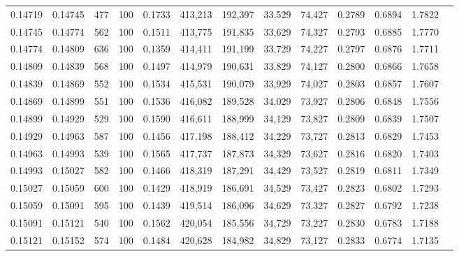 \begin{tabular}{rrrrrrrrrrrrr}
0.14719 & 0.14745 &   477 & 100 &                                     0.1733 & 413,213 & 192,397 &  33,529 &  74,427 & 0.2789 & 0.6894 & 1.7822 \\
0.14745 & 0.14774 &   562 & 100 &                                     0.1511 & 413,775 & 191,835 &  33,629 &  74,327 & 0.2793 & 0.6885 & 1.7770 \\
0.14774 & 0.14809 &   636 & 100 &                                     0.1359 & 414,411 & 191,199 &  33,729 &  74,227 & 0.2797 & 0.6876 & 1.7711 \\
0.14809 & 0.14839 &   568 & 100 &                                     0.1497 & 414,979 & 190,631 &  33,829 &  74,127 & 0.2800 & 0.6866 & 1.7658 \\
0.14839 & 0.14869 &   552 & 100 &                                     0.1534 & 415,531 & 190,079 &  33,929 &  74,027 & 0.2803 & 0.6857 & 1.7607 \\
0.14869 & 0.14899 &   551 & 100 &                                     0.1536 & 416,082 & 189,528 &  34,029 &  73,927 & 0.2806 & 0.6848 & 1.7556 \\
0.14899 & 0.14929 &   529 & 100 &                                     0.1590 & 416,611 & 188,999 &  34,129 &  73,827 & 0.2809 & 0.6839 & 1.7507 \\
0.14929 & 0.14963 &   587 & 100 &                                     0.1456 & 417,198 & 188,412 &  34,229 &  73,727 & 0.2813 & 0.6829 & 1.7453 \\
0.14963 & 0.14993 &   539 & 100 &                                     0.1565 & 417,737 & 187,873 &  34,329 &  73,627 & 0.2816 & 0.6820 & 1.7403 \\
0.14993 & 0.15027 &   582 & 100 &                                     0.1466 & 418,319 & 187,291 &  34,429 &  73,527 & 0.2819 & 0.6811 & 1.7349 \\
0.15027 & 0.15059 &   600 & 100 &                                     0.1429 & 418,919 & 186,691 &  34,529 &  73,427 & 0.2823 & 0.6802 & 1.7293 \\
0.15059 & 0.15091 &   595 & 100 &                                     0.1439 & 419,514 & 186,096 &  34,629 &  73,327 & 0.2827 & 0.6792 & 1.7238 \\
0.15091 & 0.15121 &   540 & 100 &                                     0.1562 & 420,054 & 185,556 &  34,729 &  73,227 & 0.2830 & 0.6783 & 1.7188 \\
0.15121 & 0.15152 &   574 & 100 &                                     0.1484 & 420,628 & 184,982 &  34,829 &  73,127 & 0.2833 & 0.6774 & 1.7135 \\

\end{tabular}
